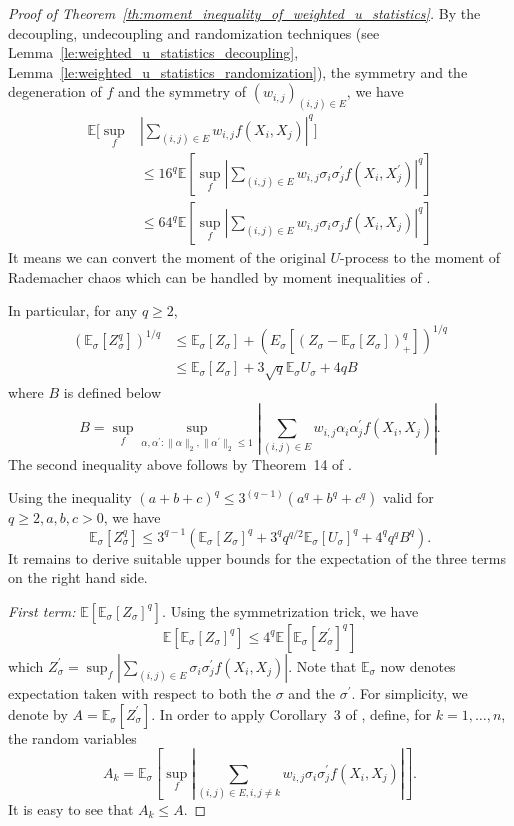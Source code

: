 \documentclass[letterpaper]{article} %
\newcommand{\E}{\mathbb{E}}
\newcommand{\rademacher}{\sigma}
\newcommand{\pair}[1]{(#1)}
\begin{document}
\begin{proof}[Proof of Theorem~\ref{th:moment_inequality_of_weighted_u_statistics}] %
By the decoupling, undecoupling and randomization techniques (see Lemma~\ref{le:weighted_u_statistics_decoupling}, Lemma~\ref{le:weighted_u_statistics_randomization}), the symmetry and the degeneration of $f$ and the symmetry of $(w_{i,j})_{\pair{i,j}\in E}$, we have
\begin{align*}
    \E[\sup_f&|\sum_{\pair{i,j}\in E}w_{i,j} f(X_i,X_j)|^q]\\
    &\le 16^q\E[\sup_f|\sum_{\pair{i,j}\in E}w_{i,j}\rademacher_i\rademacher_j^\prime f(X_i, X_j^\prime)|^q]\\
    &\le 64^q\E[\sup_f|\sum_{\pair{i,j}\in E}w_{i,j}\rademacher_i\rademacher_j f(X_i, X_j)|^q]
\end{align*}
It means we can convert the moment of the original $U$-process to the moment of Rademacher chaos which can be handled by moment inequalities of \cite{Boucheron2005}.

In particular, for any $q\ge 2$,
\begin{align*}
    (\E_\rademacher[Z_\rademacher^q])^{1/q}
    &\le \E_\rademacher[Z_\rademacher] + (E_\rademacher[(Z_\rademacher-\E_\rademacher[Z_\rademacher])_+^q])^{1/q}\\
    &\le \E_\rademacher[Z_\rademacher]+3\sqrt{q}\E_\rademacher U_\rademacher + 4qB
\end{align*}
where $B$ is defined below
\[B=\sup_f\sup_{\alpha,\alpha^\prime:\|\alpha\|_2,\|\alpha^\prime\|_2\le 1}|\sum_{\pair{i,j}\in E}w_{i,j}\alpha_i\alpha_j^\prime f(X_i,X_j)|.\]
The second inequality above follows by Theorem~14 of \cite{Boucheron2005}.

Using the inequality $(a+b+c)^q\le 3^{(q-1)}(a^q+b^q+c^q)$ valid for $q\ge 2,a,b,c>0$, we have
\[\E_\rademacher[Z_\rademacher^q]\le 3^{q-1}(\E_\rademacher[Z_\rademacher]^q+3^qq^{q/2}\E_\rademacher[U_\rademacher]^q+4^qq^qB^q).\]
It remains to derive suitable upper bounds for the expectation of the three terms on the right hand side.

\textit{First term:} $\E[\E_\rademacher[Z_\rademacher]^q]$. Using the symmetrization trick, we have
\[\E[\E_\rademacher[Z_\rademacher]^q]\le 4^q\E[\E_\rademacher[Z_\rademacher^\prime]^q]\]
which $Z_\rademacher^\prime = \sup_f|\sum_{\pair{i,j}\in E}\rademacher_i\rademacher_j^\prime f(X_i,X_j)|$. Note that $\E_\rademacher$ now denotes expectation taken with respect to both the $\rademacher$ and the $\rademacher^\prime$. For simplicity, we denote by $A=\E_{\rademacher}[Z_\rademacher^\prime]$. In order to apply Corollary~3 of \cite{Boucheron2005}, define, for $k=1,\dots,n$, the random variables
\[A_k = \E_{\rademacher}[\sup_f |\sum_{\pair{i,j}\in E,i,j\neq k}w_{i,j}\rademacher_i\rademacher_j^\prime f(X_i,X_j)|].\]
It is easy to see that $A_k\le A$.


\end{proof}
\end{document}

